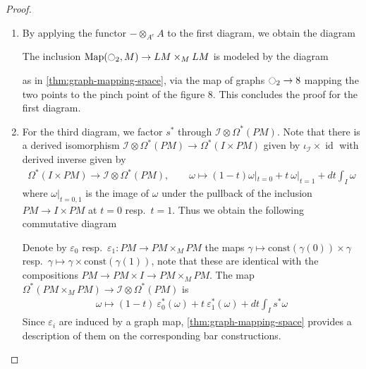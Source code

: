 \documentclass{scrartcl}
\theoremstyle{plain}
\theoremstyle{definition}
\renewcommand{\epsilon}{\varepsilon}
\newcommand{\quiso}{\simeq}
\DeclareMathOperator{\id}{id}
\DeclareMathOperator{\Map}{Map}
\newcommand{\blank}{-}
\begin{document}
\begin{proof}
\begin{enumerate}
    \item By applying the functor $\blank \otimes_{A^e} A$ to the first diagram, we obtain the diagram
    \begin{center}
    \end{center}
    The inclusion $\Map(\ocircle_2, M)\to LM\times_M LM$ is modeled by the diagram
    \begin{center}
    \end{center}
    as in \ref{thm:graph-mapping-space}, via the map of graphs $\ocircle_2\to 8$ mapping the two points to the pinch point of the figure $8$. This concludes the proof for the first diagram.

    
    \item For the third diagram, we factor $s^*$ through $\mathcal I\otimes \Omega^*(PM)$. Note that there is a derived isomorphism $\mathcal I\otimes\Omega^*(PM)\to \Omega^*(I\times PM)$ given by $\iota_{\mathcal I}\times\id$ with derived inverse given by 
    \begin{align*}
        \Omega^*(I\times PM) \to \mathcal I \otimes \Omega^*(PM),\qquad\omega\mapsto (1-t)\omega|_{t=0} + t\ \omega|_{t=1} + dt \int_I \omega
    \end{align*}
    where $\omega|_{t=0,1}$ is the image of $\omega$ under the pullback of the inclusion $PM\to I\times PM$ at $t=0$ resp.\ $t=1$.
    Thus we obtain the following commutative diagram
    \begin{center}
    \end{center}
    Denote by $\epsilon_{0}$ resp.\ $\epsilon_1\colon PM\to PM\times_M PM$ the maps $\gamma\mapsto \mathrm{const}(\gamma(0))\times \gamma$ resp.\ $\gamma\mapsto \gamma\times \mathrm{const}(\gamma(1))$, note that these are identical with the compositions $PM\to PM\times I\to PM\times_M PM$. The map $\Omega^*(PM\times_M PM) \to \mathcal I \otimes \Omega^*(PM) $ is
    \begin{align*}
        \omega \mapsto (1-t)\ \epsilon_0^*(\omega) + t\ \epsilon_1^*(\omega) + dt \int_I s^*\omega
    \end{align*}
    Since $\epsilon_i$ are induced by a graph map, \cref{thm:graph-mapping-space} provides a description of them on the corresponding bar constructions. 
    

\end{enumerate}
\end{proof}
\end{document}
